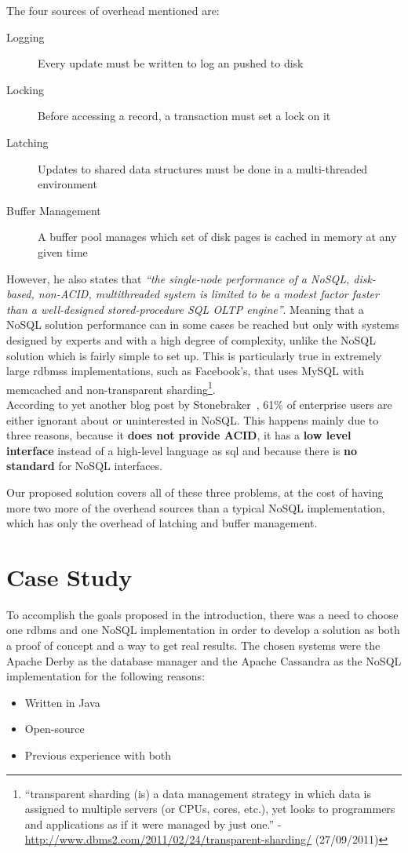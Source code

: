 The four sources of overhead mentioned are:
\begin{description}
	\item[Logging] Every update must be written to log an pushed to disk 
	\item[Locking] Before accessing a record, a transaction must set a lock on it
	\item[Latching] Updates to shared data structures must be done in a multi-threaded environment
	\item[Buffer Management] A buffer pool manages which set of disk pages is cached in memory at any given time
\end{description}

However, he also states that \emph{``the single-node performance of a NoSQL, disk-based, non-ACID, multithreaded system is limited to be a modest factor faster than a well-designed stored-procedure SQL OLTP engine''}. Meaning that a NoSQL solution performance can in some cases be reached but only with systems designed by experts and with a high degree of complexity, unlike the NoSQL solution which is fairly simple to set up. This is particularly true in extremely large \acp{rdbms} implementations, such as Facebook's, that uses MySQL with memcached and non-transparent sharding\footnote{``transparent sharding (is) a data management strategy in which data is assigned to multiple servers (or CPUs, cores, etc.), yet looks to programmers and applications as if it were managed by just one.'' - \url{http://www.dbms2.com/2011/02/24/transparent-sharding/} (27/09/2011)}. \\

According to yet another blog post by Stonebraker~\cite{stoneEnter}, 61\% of enterprise users are either ignorant about or uninterested in NoSQL. This happens mainly due to three reasons, because it \textbf{does not provide ACID}, it has a \textbf{low level interface} instead of a high-level language as \ac{sql} and because there is \textbf{no standard} for NoSQL interfaces. 

Our proposed solution covers all of these three problems, at the cost of having more two more of the overhead sources than a typical NoSQL implementation, which has only the overhead of latching and buffer management.

\section{Case Study}
To accomplish the goals proposed in the introduction, there was a need to choose one \ac{rdbms} and one NoSQL implementation in order to develop a solution as both a proof of concept and a way to get real results. The chosen systems were the Apache Derby as the database manager and the Apache Cassandra as the NoSQL implementation for the following reasons:

\begin{itemize}
	\item Written in Java
	\item Open-source
	\item Previous experience with both
\end{itemize}